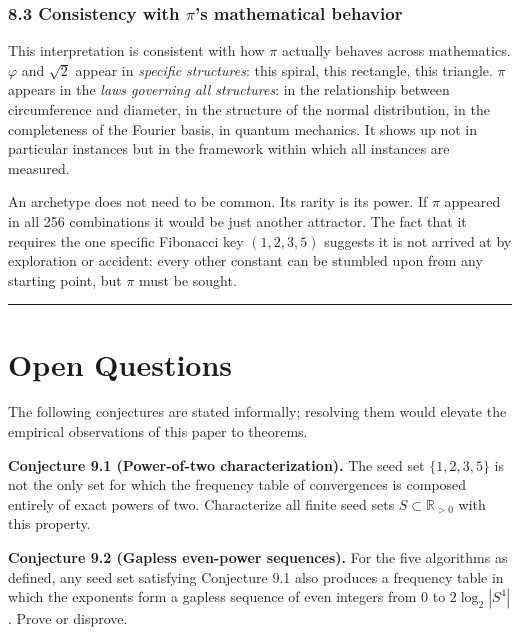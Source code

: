 \documentclass[12pt]{article}
\begin{document}
\subsubsection{\texorpdfstring{8.3 Consistency with \(\pi\)'s
mathematical
behavior}{8.3 Consistency with \textbackslash pi's mathematical behavior}}\label{consistency-with-pis-mathematical-behavior}

This interpretation is consistent with how \(\pi\) actually behaves
across mathematics. \(\varphi\) and \(\sqrt{2}\) appear in
\emph{specific structures}: this spiral, this rectangle, this triangle.
\(\pi\) appears in the \emph{laws governing all structures}: in the
relationship between circumference and diameter, in the structure of the
normal distribution, in the completeness of the Fourier basis, in
quantum mechanics. It shows up not in particular instances but in the
framework within which all instances are measured.

An archetype does not need to be common. Its rarity is its power. If
\(\pi\) appeared in all 256 combinations it would be just another
attractor. The fact that it requires the one specific Fibonacci key
\((1, 2, 3, 5)\) suggests it is not arrived at by exploration or
accident: every other constant can be stumbled upon from any starting
point, but \(\pi\) must be sought.

\begin{center}\rule{0.5\linewidth}{0.5pt}\end{center}

\section{Open Questions}\label{open-questions}

The following conjectures are stated informally; resolving them would
elevate the empirical observations of this paper to theorems.

\textbf{Conjecture 9.1 (Power-of-two characterization).} The seed set
\(\{1, 2, 3, 5\}\) is not the only set for which the frequency table of
convergences is composed entirely of exact powers of two. Characterize
all finite seed sets \(S \subset \mathbb{R}_{>0}\) with this property.

\textbf{Conjecture 9.2 (Gapless even-power sequences).} For the five
algorithms as defined, any seed set satisfying Conjecture 9.1 also
produces a frequency table in which the exponents form a gapless
sequence of even integers from 0 to \(2\log_2|S^4|\). Prove or disprove.
\end{document}
